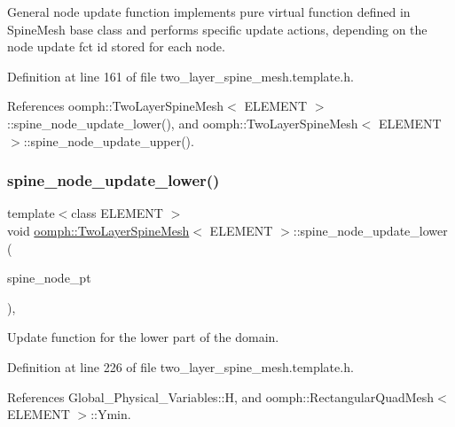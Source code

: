 General node update function implements pure virtual function defined in Spine\+Mesh base class and performs specific update actions, depending on the node update fct id stored for each node. 



Definition at line 161 of file two\+\_\+layer\+\_\+spine\+\_\+mesh.\+template.\+h.



References oomph\+::\+Two\+Layer\+Spine\+Mesh$<$ E\+L\+E\+M\+E\+N\+T $>$\+::spine\+\_\+node\+\_\+update\+\_\+lower(), and oomph\+::\+Two\+Layer\+Spine\+Mesh$<$ E\+L\+E\+M\+E\+N\+T $>$\+::spine\+\_\+node\+\_\+update\+\_\+upper().

\mbox{\label{classoomph_1_1TwoLayerSpineMesh_a7973ed642b9adff26bf531c76dade747}} 
\subsubsection{\texorpdfstring{spine\+\_\+node\+\_\+update\+\_\+lower()}{spine\_node\_update\_lower()}}
{\footnotesize\ttfamily template$<$class E\+L\+E\+M\+E\+NT $>$ \\
void \hyperlink{classoomph_1_1TwoLayerSpineMesh}{oomph\+::\+Two\+Layer\+Spine\+Mesh}$<$ E\+L\+E\+M\+E\+NT $>$\+::spine\+\_\+node\+\_\+update\+\_\+lower (\begin{DoxyParamCaption}\item[{Spine\+Node $\ast$}]{spine\+\_\+node\+\_\+pt }\end{DoxyParamCaption})\hspace{0.3cm}{\ttfamily [inline]}, {\ttfamily [protected]}}



Update function for the lower part of the domain. 



Definition at line 226 of file two\+\_\+layer\+\_\+spine\+\_\+mesh.\+template.\+h.



References Global\+\_\+\+Physical\+\_\+\+Variables\+::H, and oomph\+::\+Rectangular\+Quad\+Mesh$<$ E\+L\+E\+M\+E\+N\+T $>$\+::\+Ymin.



